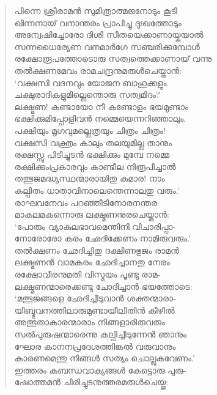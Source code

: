 \begin{verse}
പിന്നെ ശ്രീരാമന്‍ സുമിത്രാത്മജനോടും കൂടി\\
ഖിന്നനായ് വനാന്തരം പ്രാപിച്ചു ദുഃഖത്തോടും\\
അന്വേഷിച്ചോരോ ദിശി സീതയെക്കാണായ്കയാല്‍\\
സന്നധൈര്യേണ വനമാര്‍ഗേ സഞ്ചരിക്കുമ്പോള്‍\\
രക്ഷോരൂപത്തോടൊരു സത്വത്തെക്കാണായ് വന്നു\\
തല്‍ക്ഷണമേവം രാമചന്ദ്രനുമരുള്‍ചെയ്താന്‍:\\
‘വക്ഷസി വദനവും യോജന ബാഹുക്കളും\\
ചക്ഷുരാദികളുമില്ലെന്തൊരു സത്വമിദം?\\
ലക്ഷ്മണ! കണ്ടായോ നീ കണ്ടോളം ഭയമുണ്ടാം\\
ഭക്ഷിക്കുമിപ്പോളിവന്‍ നമ്മെയെന്നറിഞ്ഞാലും.\\
പക്ഷിയും മൃഗവുമല്ലെത്രയും ചിത്രം ചിത്രം!\\
വക്ഷസി വക്ത്രം കാലും തലയുമില്ല താനും\\
രക്ഷസ്സു പിടിച്ചുടന്‍ ഭക്ഷിക്കും മുമ്പേ നമ്മെ\\
രക്ഷിക്കുംപ്രകാരവും കാണ്ടീല നിരൂപിച്ചാല്‍\\
തത്ഭുജമദ്ധ്യസ്ഥന്മാരായിതു കുമാര! നാം\\
കല്പിതം ധാതാവിനാലെന്തെന്നാലതു വരും.’\\
രാഘവനേവം പറഞ്ഞീടിനോരനന്തര-\\
മാകുലമകന്നൊരു ലക്ഷ്മണനുരചെയ്താന്‍:\\
‘പോരും വ്യാകുലഭാവമെന്തിനി വിചാരിപ്പാ-\\
നോരോരോ കരം ഛേദിക്കേണം നാമിരുവരും.’\\
തല്‍ക്ഷണം ഛേദിച്ചിതു ദക്ഷിണഭുജം രാമന്‍\\
ലക്ഷ്മണന്‍ വാമകരം ഛേദിച്ചാനതു നേരം\\
രക്ഷോവീരനുമതി വിസ്മയം പൂണ്ടു രാമ-\\
ലക്ഷ്മണന്മാരെക്കണ്ടു ചോദിച്ചാന്‍ ഭയത്തോടെ:\\
‘മത്ഭുജങ്ങളെ ഛേദിച്ചീടുവാന്‍ ശക്തന്മാരാ-\\
യിബ്ഭുവനത്തിലാരുമുണ്ടായീലിതിന്‍ കീഴില്‍\\
അത്ഭുതാകാരന്മാരാം നിങ്ങളാരിരുവരും\\
സല്‍പുരുഷന്മാരെന്നു കല്പിച്ചീടുന്നേന്‍ ഞാനും\\
ഘോര കാനനപ്രദേശത്തിങ്കല്‍ വരുവാനും\\
കാരണമെന്തു നിങ്ങള്‍ സത്യം ചൊല്ലുകവേണം.’\\
ഇത്തരം കബന്ധവാക്യങ്ങള്‍ കേട്ടൊരു പുരു-\\
ഷോത്തമന്‍ ചിരിച്ചുടനുത്തരമരുള്‍ചെയ്തു:\\

\end{verse}
